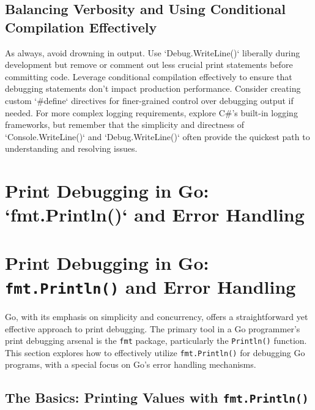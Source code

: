 \documentclass{article}
\begin{document}
{{{{\begin{itemize}
{        \begin{verbatim}
            person.Age = 31;
            Debug.WriteLine($"Person's age after update: {person.Age}");
        \end{verbatim}
\end{itemize}

\subsection*{Balancing Verbosity and Using Conditional Compilation Effectively}

As always, avoid drowning in output.  Use `Debug.WriteLine()` liberally during development but remove or comment out less crucial print statements before committing code. Leverage conditional compilation effectively to ensure that debugging statements don't impact production performance. Consider creating custom `#define` directives for finer-grained control over debugging output if needed. For more complex logging requirements, explore C#'s built-in logging frameworks, but remember that the simplicity and directness of `Console.WriteLine()` and `Debug.WriteLine()` often provide the quickest path to understanding and resolving issues.

\newpage

\section*{Print Debugging in Go: `fmt.Println()` and Error Handling} %
\label{chapter-9-6-Print_Debugging_in_Go___fmt.Println____a}

\section*{Print Debugging in Go: \texttt{fmt.Println()} and Error Handling}

Go, with its emphasis on simplicity and concurrency, offers a straightforward yet effective approach to print debugging.  The primary tool in a Go programmer's print debugging arsenal is the \texttt{fmt} package, particularly the \texttt{Println()} function. This section explores how to effectively utilize \texttt{fmt.Println()} for debugging Go programs, with a special focus on Go's error handling mechanisms.

\subsection*{The Basics: Printing Values with \texttt{fmt.Println()}}

}}}}
\end{document}
